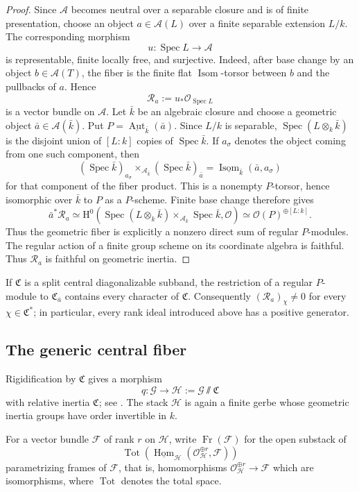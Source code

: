 \documentclass[11pt,reqno]{amsart}
\numberwithin{equation}{section}
\theoremstyle{plain}
\theoremstyle{definition}
\def\cA{{\mathcal A}}
\def\cG{{\mathcal G}}
\def\cH{{\mathcal H}}
\def\fC{{\mathfrak C}}
\def\Spec{{\operatorname{Spec}}}
\def\Aut{{\operatorname{Aut}}}
\def\ra{{\rightarrow}}
\def\Tot{{\operatorname{Tot}}}
\def\H{{\mathrm H}}
\begin{document}
\begin{proof}
Since $\cA$ becomes neutral over a separable closure and is of finite
presentation, choose an object $a\in\cA(L)$ over a finite separable
extension $L/k$.
The corresponding morphism
\[
u:\Spec L\ra\cA
\]
is representable, finite locally free, and surjective.  Indeed, after
base change by an object $b\in\cA(T)$, the fiber is the finite flat
$\operatorname{Isom}$-torsor between $b$ and the pullbacks of $a$.
Hence
\[
\mathcal R_a:=u_*\mathcal O_{\Spec L}
\]
is a vector bundle on $\cA$.  Let $\bar k$ be an algebraic closure and
choose a geometric object $\bar a\in\cA(\bar k)$.  Put
$P=\underline{\Aut}_{\bar k}(\bar a)$.  Since $L/k$ is separable,
$\Spec(L\otimes_k\bar k)$ is the disjoint union of
$[L:k]$ copies of $\Spec\bar k$.  If $a_\sigma$ denotes the object
coming from one such component, then
\[
(\Spec\bar k)_{a_\sigma}
\times_{\cA_{\bar k}}
(\Spec\bar k)_{\bar a}
=\underline{\operatorname{Isom}}_{\bar k}(\bar a,a_\sigma)
\]
for that component of the fiber product.  This is a nonempty
$P$-torsor, hence isomorphic over $\bar k$ to $P$ as a
$P$-scheme.  Finite base change therefore gives
\[
\bar a^*\mathcal R_a
\simeq
\H^0\!\left(
\Spec(L\otimes_k\bar k)\times_{\cA_{\bar k}}\Spec\bar k,
\mathcal O
\right)
\simeq
\mathcal O(P)^{\oplus[L:k]}.
\]
Thus the geometric fiber is explicitly a nonzero direct sum of regular
$P$-modules.  The regular action of a finite group scheme on its
coordinate algebra is faithful.
Thus $\mathcal R_a$ is faithful on geometric inertia.
\end{proof}

If $\fC$ is a split central diagonalizable subband, the restriction of a
regular $P$-module to $\fC_{\bar a}$ contains every
character of $\fC$.
Consequently $(\mathcal R_a)_\chi\ne0$ for every $\chi\in\fC^*$;
in particular, every rank ideal introduced above has a positive
generator.

\subsection{The generic central fiber}\label{sec:generic-central-fibre}

Rigidification by $\fC$ gives a morphism
\[
q:\cG\ra\cH:=\cG\!\sslash\fC
\]
with relative inertia $\fC$; see \cite[Section~5.1]{ACV}.  The stack
$\cH$ is again a finite gerbe whose geometric inertia groups have order
invertible in $k$.

For a vector bundle $\mathcal F$ of rank $r$ on $\cH$, write
$\operatorname{Fr}(\mathcal F)$ for the open substack of
\[
\Tot\!\left(
\underline{\operatorname{Hom}}_{\cH}
(\mathcal O_{\cH}^{\oplus r},\mathcal F)
\right)
\]
parametrizing frames of $\mathcal F$, that is, homomorphisms
$\mathcal O_{\cH}^{\oplus r}\to\mathcal F$ which are isomorphisms, where $\Tot$ denotes the total space.
\end{document}
